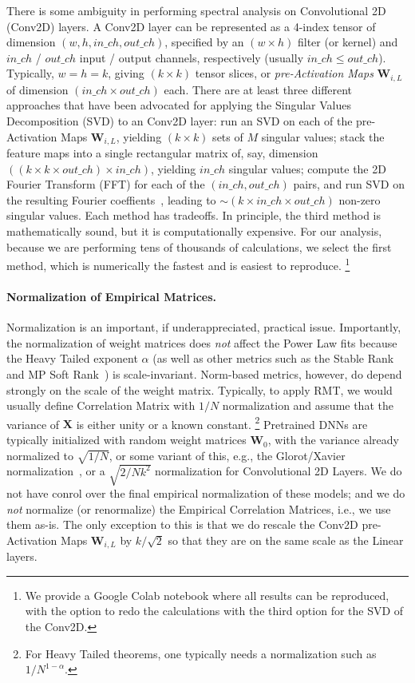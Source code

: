 There is some ambiguity in performing spectral analysis on Convolutional 2D (Conv2D) layers.  
A Conv2D layer can be represented as a 4-index tensor of dimension $(w,h,in\_ch,out\_ch)$, specified by an $(w\times h)$ filter (or kernel) and $in\_ch$ / $out\_ch$ input / output channels, respectively (usually $in\_ch\le out\_ch$). 
Typically, $w=h=k$,  giving $(k\times k)$ tensor slices, or \emph{pre-Activation Maps} $\mathbf{W}_{i,L}$ of dimension $(in\_ch\times out\_ch)$ each. 
%
There are at least three different approaches that have been advocated for applying the Singular Values Decomposition (SVD) to an Conv2D layer:
run an SVD on each of the pre-Activation Maps $\mathbf{W}_{i,L}$, yielding $(k\times k)$ sets of $M$ singular values; 
stack the feature maps into a single rectangular matrix of, say, dimension $((k\times k\times out\_ch)\times in\_ch)$, yielding $in\_ch$ singular values;
compute the 2D Fourier Transform (FFT) for each of the $(in\_ch, out\_ch)$ pairs, and run SVD on the resulting Fourier coeffients~\cite{Long2019}, leading to $\sim(k\times in\_ch\times out\_ch)$ non-zero singular values.
Each method has tradeoffs.  
In principle, the third method is mathematically sound, but it is computationally expensive. 
For our analysis, because we are performing tens of thousands of calculations, we select the first method, which is numerically the fastest and is easiest to reproduce.%
\footnote{We provide a Google Colab notebook where all results can be reproduced, with the option to redo the calculations with the third option for the SVD of the Conv2D.}


\paragraph{Normalization of Empirical Matrices.}  
Normalization is an important, if underappreciated, practical issue.
Importantly, the normalization of weight matrices does \emph{not} affect the Power Law fits because the Heavy Tailed exponent $\alpha$ (as well as other metrics such as the Stable Rank and MP Soft Rank~\cite{MM18_TR,MM19_HTSR_ICML}) is scale-invariant.
Norm-based metrics, however, do depend strongly on the scale of the weight matrix.
Typically, to apply RMT, we would usually define Correlation Matrix with $1/N$ normalization and assume that the variance of $\mathbf{X}$ is either unity or a known constant.%
\footnote{For Heavy Tailed theorems, one typically needs a normalization such as $1/N^{1-\alpha}$.}
Pretrained DNNs are typically initialized with random weight matrices $\mathbf{W}_{0}$, with the variance already normalized to $\sqrt{1/N}$, or some variant of this, e.g., the Glorot/Xavier normalization~\cite{GloRot}, or a $\sqrt{2/Nk^2}$ normalization for Convolutional 2D Layers.
We do not have conrol over the final empirical normalization of these models; and we do \emph{not} normalize (or renormalize) the Empirical Correlation Matrices, i.e., we use them as-is.
The only exception to this is that we do rescale the Conv2D pre-Activation Maps $\mathbf{W}_{i,L}$ by $k/\sqrt{2}$ so that they are on the same scale as the Linear layers.

